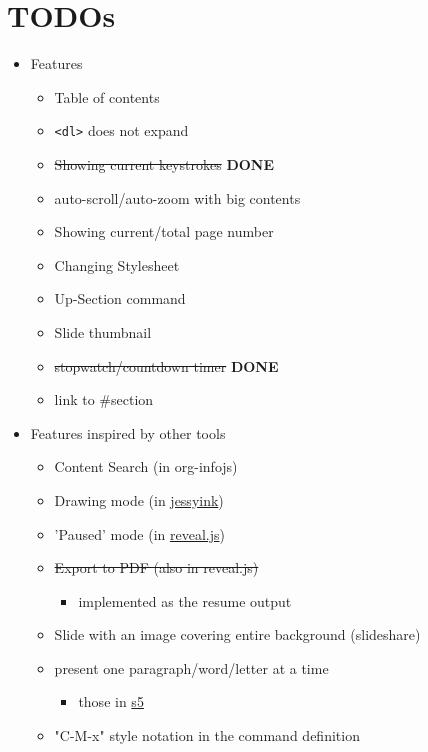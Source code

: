 \section{TODOs}
\label{sec-11}


\begin{container-fluid}
\begin{row-fluid}
\begin{span6}
\begin{smaller}
\begin{itemize}
\item Features
\begin{itemize}
\item Table of contents
\item \texttt{<dl>} does not expand
\item \sout{Showing current keystrokes} \textbf{DONE}
\item auto-scroll/auto-zoom with big contents
\item Showing current/total page number
\item Changing Stylesheet
\item Up-Section command
\item Slide thumbnail
\item \sout{stopwatch/countdown timer} \textbf{DONE}
\item link to \#section
\end{itemize}
\end{itemize}
\end{smaller}
\end{span6}
\begin{span6}
\begin{smaller}
\begin{itemize}
\item Features inspired by other tools
\begin{itemize}
\item Content Search (in org-infojs)
\item Drawing mode (in \href{http://code.google.com/p/jessyink/}{jessyink})
\item 'Paused' mode (in \href{http://lab.hakim.se/reveal-js/}{reveal.js})
\item \sout{Export to PDF (also in reveal.js)}
\begin{itemize}
\item implemented as the resume output
\end{itemize}
\item Slide with an image covering entire background (slideshare)
\item present one paragraph/word/letter at a time
\begin{itemize}
\item those in \href{http://docutils.sourceforge.net/docs/user/slide-shows.s5.html}{s5}
\end{itemize}
\item "C-M-x" style notation in the command definition
\end{itemize}
\end{itemize}
\end{smaller}
\end{span6}
\end{row-fluid}
\end{container-fluid}
